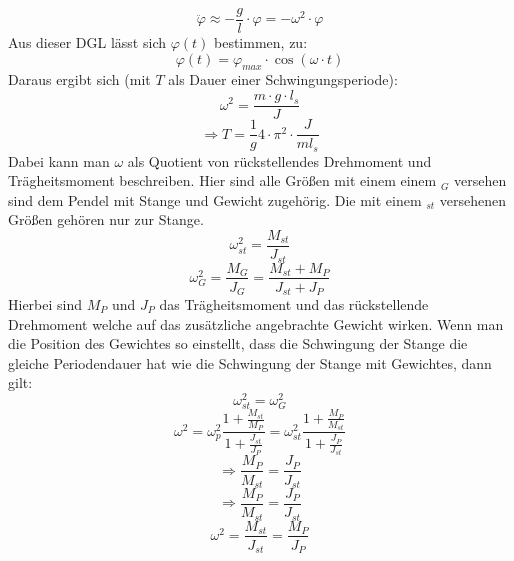 \documentclass[twoside]{protokoll}
\begin{document}
\begin{equation}
    \ddot{\varphi} \approx -\frac{g}{l} \cdot \varphi = - \omega^2 \cdot \varphi
\end{equation}
Aus dieser DGL lässt sich $\varphi(t)$ bestimmen, zu:
\begin{equation}
    \varphi(t) = \varphi_{max} \cdot \cos(\omega \cdot t)
\end{equation}
Daraus ergibt sich (mit $T$ als Dauer einer Schwingungsperiode):
\begin{equation}
    \omega^2 = \frac{m \cdot g \cdot l_s}{J}
\end{equation}
\begin{equation}
    \Rightarrow T = \frac{1}{g} 4 \cdot \pi^2 \cdot \frac{J}{m l_s}
    \label{periodendauer}
\end{equation}
Dabei kann man $\omega$ als Quotient von rückstellendes Drehmoment und Trägheitsmoment beschreiben.
Hier sind alle Größen mit einem einem $_{G}$ versehen sind dem Pendel mit Stange und Gewicht zugehörig. Die mit einem $_{st}$ versehenen Größen gehören nur zur Stange.
\begin{equation}
    \omega_{st}^2 = \frac{M_{st}}{J_{st}}
\end{equation}
\begin{equation}
    \omega_{G}^2 = \frac{M_G}{J_G} = \frac{M_{st} + M_P}{J_{st} + J_P}
\end{equation}
Hierbei sind $M_P$ und $J_P$ das Trägheitsmoment und das rückstellende Drehmoment welche auf das zusätzliche angebrachte Gewicht wirken.
Wenn man die Position des Gewichtes so einstellt, dass die Schwingung der Stange die gleiche Periodendauer hat wie die Schwingung der Stange mit Gewichtes, dann gilt:
\begin{equation}
    \omega_{st}^2 = \omega_{G}^2
\end{equation}
\begin{equation}
    \omega^2 = \omega_p^2 \frac{1 + \frac{M_{st}}{M_P}}{1+\frac{J_{st}}{J_P}} = \omega_{st}^2 \frac{1 + \frac{M_P}{M_{st}}}{1+\frac{J_P}{J_{st}}}
\end{equation}
\begin{equation}
    \Rightarrow \frac{M_P}{M_{st}} = \frac{J_P}{J_{st}}
\end{equation}
\begin{equation}
    \Rightarrow \frac{M_P}{M_{st}} = \frac{J_P}{J_{st}}
\end{equation}
\begin{equation}
    \omega^2 = \frac{M_{st}}{J_{st}} = \frac{M_P}{J_P}
\end{equation}
\end{document}
